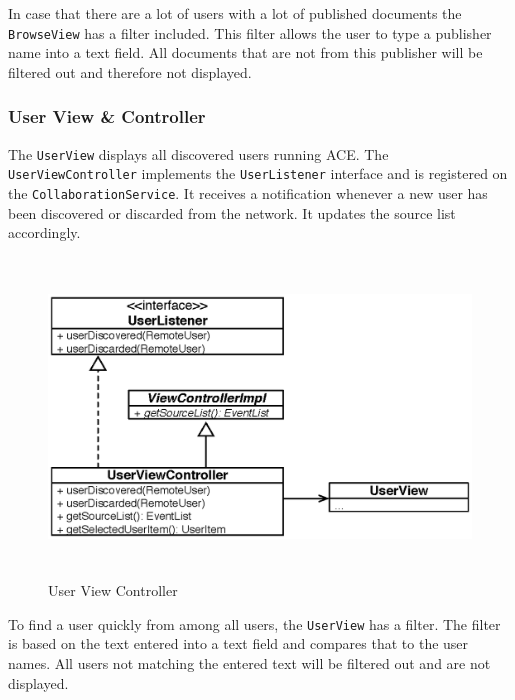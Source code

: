 In case that there are a lot of users with a lot of published documents the \texttt{Browse\-View} has a filter included. This filter allows the user to type a publisher name into a text field. All documents that are not from this publisher will be filtered out and therefore not displayed.


\subsubsection{User View \& Controller}
The \texttt{User\-View} displays all discovered users running ACE. The \texttt{User\-View\-Controller} implements the \texttt{User\-Listener} interface and is registered on the \texttt{Collaboration\-Service}. It receives a notification whenever a new user has been discovered or discarded from the network. It updates the source list accordingly. 

\begin{figure}[H]
\begin{center}
  \includegraphics[height=3.33in, width=5.62in]{../images/finalreport/application_userview.eps}
\caption{User View Controller}
\label{application_userview}
\end{center}
\end{figure}

To find a user quickly from among all users, the \texttt{User\-View} has a filter. The filter is based on the text entered into a text field and compares that to the user names. All users not matching the entered text will be filtered out and are not displayed.

